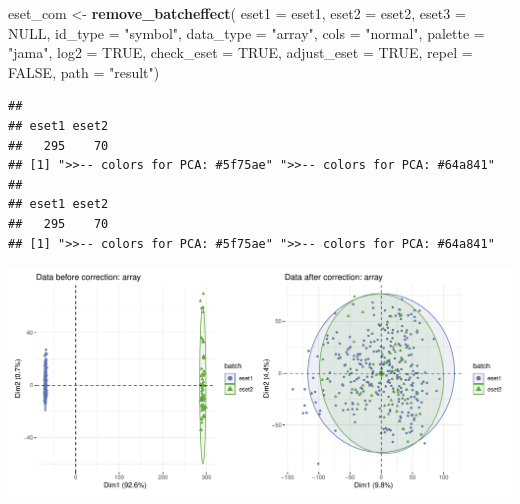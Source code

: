 \documentclass[
  12pt,
]{book}
\newenvironment{Shaded}{\begin{snugshade}}{\end{snugshade}}
\newcommand{\AttributeTok}[1]{\textcolor[rgb]{0.13,0.29,0.53}{#1}}
\newcommand{\ConstantTok}[1]{\textcolor[rgb]{0.56,0.35,0.01}{#1}}
\newcommand{\FunctionTok}[1]{\textcolor[rgb]{0.13,0.29,0.53}{\textbf{#1}}}
\newcommand{\NormalTok}[1]{#1}
\newcommand{\OtherTok}[1]{\textcolor[rgb]{0.56,0.35,0.01}{#1}}
\newcommand{\StringTok}[1]{\textcolor[rgb]{0.31,0.60,0.02}{#1}}
\theoremstyle{definition}
\theoremstyle{definition}
\theoremstyle{definition}
\theoremstyle{definition}
\theoremstyle{remark}
\begin{document}
\begin{Shaded}
\begin{Highlighting}[]
\NormalTok{eset\_com }\OtherTok{\textless{}{-}} \FunctionTok{remove\_batcheffect}\NormalTok{( }\AttributeTok{eset1       =}\NormalTok{ eset1,  }
                                \AttributeTok{eset2       =}\NormalTok{ eset2,   }
                                \AttributeTok{eset3       =} \ConstantTok{NULL}\NormalTok{,}
                                \AttributeTok{id\_type     =} \StringTok{"symbol"}\NormalTok{,}
                                \AttributeTok{data\_type   =} \StringTok{"array"}\NormalTok{, }
                                \AttributeTok{cols        =} \StringTok{"normal"}\NormalTok{, }
                                \AttributeTok{palette     =} \StringTok{"jama"}\NormalTok{, }
                                \AttributeTok{log2        =} \ConstantTok{TRUE}\NormalTok{, }
                                \AttributeTok{check\_eset  =} \ConstantTok{TRUE}\NormalTok{,}
                                \AttributeTok{adjust\_eset =} \ConstantTok{TRUE}\NormalTok{,}
                                \AttributeTok{repel       =} \ConstantTok{FALSE}\NormalTok{,}
                                \AttributeTok{path        =} \StringTok{"result"}\NormalTok{)}
\end{Highlighting}
\end{Shaded}

\begin{verbatim}
## 
## eset1 eset2 
##   295    70 
## [1] ">>-- colors for PCA: #5f75ae" ">>-- colors for PCA: #64a841"
## 
## eset1 eset2 
##   295    70 
## [1] ">>-- colors for PCA: #5f75ae" ">>-- colors for PCA: #64a841"
\end{verbatim}

\begin{center}\includegraphics{_main_files/figure-latex/unnamed-chunk-12-1} \end{center}
\end{document}
